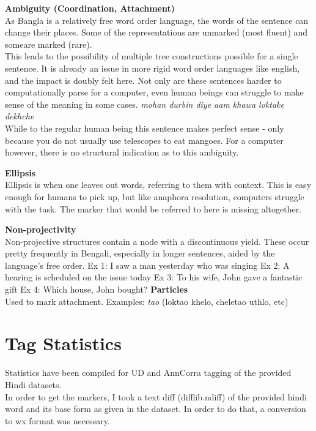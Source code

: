 \documentclass[a4 paper]{article}
\begin{document}
 \textbf{Ambiguity (Coordination, Attachment)}\\
As Bangla is a relatively free word order language, the words of the sentence 
can change their places. Some of the representations are unmarked (most fluent)
and someare marked (rare).\\
This leads to the possibility of multiple tree constructions possible for a
single sentence. It is already an issue in more rigid word order languages like
english, and the impact is doubly felt here. Not only are these sentences
harder to computationally parse for a computer, even human beings can struggle
to make sense of the meaning in some cases.
\addlinespace[1em]
\textit{mohan durbin diye aam khawa loktake dekhche}\\
While to the regular human being this sentence makes perfect sense - only
because you do not usually use telescopes to eat mangoes. For a computer 
however, there is no structural indication as to this ambiguity.

 \textbf{Ellipsis}\\
Ellipsis is when one leaves out words, referring to them with context. This
is easy enough for humans to pick up, but like anaphora resolution, computers
struggle with the task. The marker that would be referred to here is missing
altogether.

 \textbf{Non-projectivity}\\
Non-projective structures contain a node with a discontinuous yield. These
occur pretty frequently in Bengali, especially in longer sentences, aided by 
the language's free order. 
	Ex 1: I saw a man yesterday who was singing
	Ex 2: A hearing is scheduled on the issue today
	Ex 3: To his wife, John gave a fantastic gift
	Ex 4: Which house, John bought?
 \textbf{Particles}\\
Used to mark attachment. Examples: \textit{tao} (loktao khelo, cheletao uthlo,
etc) 


\section{Tag Statistics}

Statistics have been compiled for UD and AnnCorra tagging of the provided Hindi
datasets.\\
In order to get the markers, I took a text diff (difflib.ndiff) of the provided
hindi word and its base form as given in the dataset. In order to do that, a
conversion to wx format was necessary.
\end{document}
